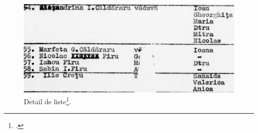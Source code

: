 \documentclass[a4paper,12pt,twoside]{book}
\begin{document}
                \begin{figure}[!ht]
        			\centering
                    \includegraphics[width=13cm]{images/rg_25_050m_0009_00000784_detail.jpg}
                    \caption{Detail de liste\footcite[][Copyright \textit{Arhivele Naţionale ale României}]{rg-25.050mfileid:45869SelectedRecordsVarious}.}
                    \label{fig14}
                \end{figure}
                \vspace{-2em}
                \pagebreak
                
\end{document}
